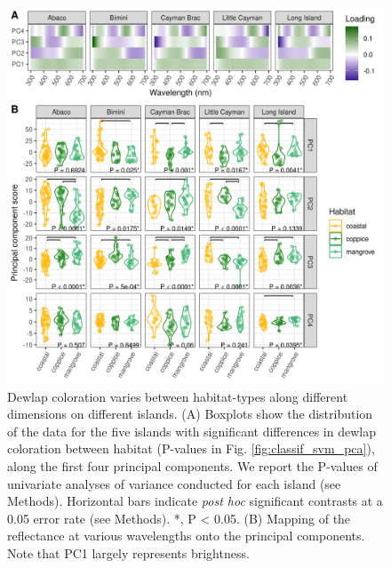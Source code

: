 \begin{figure}
    \centering
	\includegraphics[width=18cm]{figures/figure_anova.png}
	\caption{Dewlap coloration varies between habitat-types along different dimensions on different islands. (A) Boxplots show the distribution of the data for the five islands with significant differences in dewlap coloration between habitat (P-values in Fig. \ref{fig:classif_svm_pca}), along the first four principal components. We report the P-values of univariate analyses of variance conducted for each island (see Methods). Horizontal bars indicate \textit{post hoc} significant contrasts at a 0.05 error rate (see Methods). *, P < 0.05. (B) Mapping of the reflectance at various wavelengths onto the principal components. Note that PC1 largely represents brightness.}
	\label{fig:boxplots}
\end{figure}